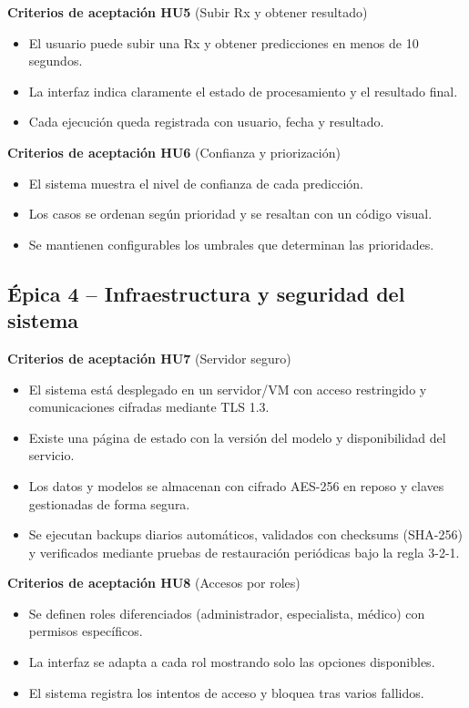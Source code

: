 \documentclass[
11pt, %
]{charter}
\begin{document}
\textbf{Criterios de aceptación HU5} (Subir Rx y obtener resultado)
\begin{itemize}
  \item El usuario puede subir una Rx y obtener predicciones en menos de 10 segundos.
  \item La interfaz indica claramente el estado de procesamiento y el resultado final.
  \item Cada ejecución queda registrada con usuario, fecha y resultado.
\end{itemize}

\textbf{Criterios de aceptación HU6} (Confianza y priorización)
\begin{itemize}
  \item El sistema muestra el nivel de confianza de cada predicción.
  \item Los casos se ordenan según prioridad y se resaltan con un código visual.
  \item Se mantienen configurables los umbrales que determinan las prioridades.
\end{itemize}

\subsection*{Épica 4 – Infraestructura y seguridad del sistema}

\textbf{Criterios de aceptación HU7} (Servidor seguro)
\begin{itemize}
  \item El sistema está desplegado en un servidor/VM con acceso restringido y comunicaciones cifradas mediante TLS 1.3.
  \item Existe una página de estado con la versión del modelo y disponibilidad del servicio.
  \item Los datos y modelos se almacenan con cifrado AES-256 en reposo y claves gestionadas de forma segura.
  \item Se ejecutan backups diarios automáticos, validados con checksums (SHA-256) y verificados mediante pruebas de restauración periódicas bajo la regla 3-2-1.
\end{itemize}



\textbf{Criterios de aceptación HU8} (Accesos por roles)
\begin{itemize}
  \item Se definen roles diferenciados (administrador, especialista, médico) con permisos específicos.
  \item La interfaz se adapta a cada rol mostrando solo las opciones disponibles.
  \item El sistema registra los intentos de acceso y bloquea tras varios fallidos.
\end{itemize}
\end{document}
